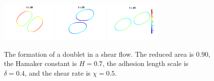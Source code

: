 \documentclass[prf,superscriptaddress,showpacs]{revtex4-1}
\begin{document}
\begin{figure}[htp]
  \includegraphics[width=0.24\textwidth]{figs/adR4em1adS7em1Chi5em1_ra090_image06.png}
  \includegraphics[width=0.24\textwidth]{figs/adR4em1adS7em1Chi5em1_ra090_image07.png}
  \includegraphics[width=0.24\textwidth]{figs/adR4em1adS7em1Chi5em1_ra090_image08.png}
  \caption{\label{fig:doublet090} The formation of a doublet in a shear
  flow.  The reduced area is $0.90$, the Hamaker constant is $H=0.7$,
  the adhesion length scale is $\delta = 0.4$, and the shear rate is
  $\chi=0.5$.}
\end{figure}
\end{document}
